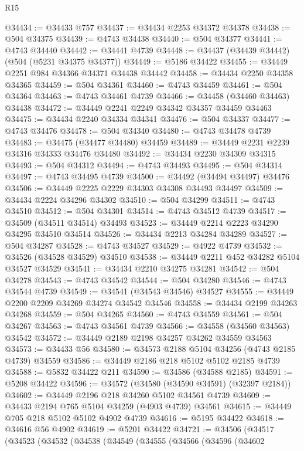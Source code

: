 \begin{lexlean}{R15}
\begin{coremodule}
{{{{{{{{{{{@34434 := @34433 @757
@34437 := @34434 @2253 @34372 @34378
@34438 := @504 @34375
@34439 := @4743 @34438
@34440 := @504 @34377
@34441 := @4743 @34440
@34442 := @34441 @4739
@34448 := @34437 (@34439 @34442) (@504 (@5231 @34375 @34377))
@34449 := @5186 @34422
@34455 := @34449 @2251 @984 @34366 @34371 @34438 @34442
@34458 := @34434 @2250 @34358 @34365
@34459 := @504 @34361
@34460 := @4743 @34459
@34461 := @504 @34364
@34463 := @4743 @34461 @4739
@34466 := @34458 (@34460 @34463) @34438
@34472 := @34449 @2241 @2249 @34342 @34357 @34459 @34463
@34475 := @34434 @2240 @34334 @34341
@34476 := @504 @34337
@34477 := @4743 @34476
@34478 := @504 @34340
@34480 := @4743 @34478 @4739
@34483 := @34475 (@34477 @34480) @34459
@34489 := @34449 @2231 @2239 @34316 @34333 @34476 @34480
@34492 := @34434 @2230 @34309 @34315
@34493 := @504 @34312
@34494 := @4743 @34493
@34495 := @504 @34314
@34497 := @4743 @34495 @4739
@34500 := @34492 (@34494 @34497) @34476
@34506 := @34449 @2225 @2229 @34303 @34308 @34493 @34497
@34509 := @34434 @2224 @34296 @34302
@34510 := @504 @34299
@34511 := @4743 @34510
@34512 := @504 @34301
@34514 := @4743 @34512 @4739
@34517 := @34509 (@34511 @34514) @34493
@34523 := @34449 @2214 @2223 @34290 @34295 @34510 @34514
@34526 := @34434 @2213 @34284 @34289
@34527 := @504 @34287
@34528 := @4743 @34527
@34529 := @4922 @4739
@34532 := @34526 (@34528 @34529) @34510
@34538 := @34449 @2211 @452 @34282 @5104 @34527 @34529
@34541 := @34434 @2210 @34275 @34281
@34542 := @504 @34278
@34543 := @4743 @34542
@34544 := @504 @34280
@34546 := @4743 @34544 @4739
@34549 := @34541 (@34543 @34546) @34527
@34555 := @34449 @2200 @2209 @34269 @34274 @34542 @34546
@34558 := @34434 @2199 @34263 @34268
@34559 := @504 @34265
@34560 := @4743 @34559
@34561 := @504 @34267
@34563 := @4743 @34561 @4739
@34566 := @34558 (@34560 @34563) @34542
@34572 := @34449 @2189 @2198 @34257 @34262 @34559 @34563
@34573 := @34433 @56
@34580 := @34573 @2188 @5104 @34256 (@4743 @2185 @4739) @34559
@34586 := @34449 @2186 @218 @5102 @5102 @2185 @4739
@34588 := @5832 @34422 @211
@34590 := @34586 (@34588 @2185)
@34591 := @5208 @34422
@34596 := @34572 (@34580 (@34590 @34591) (@32397 @2184))
@34602 := @34449 @2196 @218 @34260 @5102 @34561 @4739
@34609 := @34433 @2194 @765 @5104 @34259 (@4903 @4739) @34561
@34615 := @34449 @705 @218 @5102 @5102 @4902 @4739
@34616 := @5195 @34422
@34618 := @34616 @56 @4902
@34619 := @5201 @34422
@34721 := @34506
    (@34517
      (@34523
        (@34532
          (@34538
            (@34549
              (@34555
                (@34566
                  (@34596
                    (@34602
}}}}}}}}}}}
\end{coremodule}
\end{lexlean}
